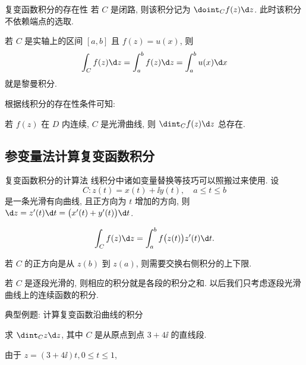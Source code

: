 \begin{frame}{复变函数积分的存在性}
	\onslide<+->
	若 $C$ 是闭路, 则该积分记为 \alert{$\doint_Cf(z)\d z$}.
	\onslide<+->
	此时该积分不依赖端点的选取.

	\onslide<+->
	若 $C$ 是实轴上的区间 $[a,b]$ 且 $f(z)=u(x)$, 
	\onslide<+->
	则
	\[
		\int_Cf(z)\d z=\int_a^bf(z)\d z=\int_a^b u(x)\d x
	\]
	就是黎曼积分.

	\onslide<+->
	根据线积分的存在性条件可知:
	\onslide<+->
	\begin{theorem}
		若 $f(z)$ 在 $D$ 内连续, $C$ 是光滑曲线, 则 $\dint_Cf(z)\d z$ 总存在.
	\end{theorem}
\end{frame}


\subsection{参变量法计算复变函数积分}

\begin{frame}{复变函数积分的计算法}
	\onslide<+->
	线积分中诸如变量替换等技巧可以照搬过来使用.
	\onslide<+->
	设
	\[
		C:z(t)=x(t)+\ii y(t),\quad a\le t\le b
	\]
	是一条光滑有向曲线, 且正方向为 $t$ 增加的方向,
	\onslide<+->
	则 $\d z=z'(t)\d t=\bigl(x'(t)+y'(t)\bigr)\d t$.
	\onslide<+->
	\begin{theorem*}
		\[
			\int_Cf(z)\d z=\int_a^b f\bigl(z(t)\bigr)z'(t)\d t.
		\]
	\end{theorem*}
	\onslide<+->
	若 $C$ 的正方向是从 $z(b)$ 到 $z(a)$, 则需要交换右侧积分的上下限.

	\onslide<+->
	若 $C$ 是逐段光滑的, 则相应的积分就是各段的积分之和.
	\onslide<+->
	以后我们\alert{只考虑逐段光滑曲线上的连续函数的积分}.
\end{frame}


\begin{frame}{典型例题: 计算复变函数沿曲线的积分}
	\onslide<+->
	\begin{example}[nearnext]
		求 $\dint_Cz\d z$, 其中 $C$ 是从原点到点 $3+4\ii$ 的直线段.
	\end{example}
	\onslide<+->
	\begin{solution}[nearprev,sidepic,righthand width=113pt]
		由于 $z=(3+4\ii)t,0\le t\le 1$,
		\bigdel
		\tcblower
	\end{solution}
\end{frame}


